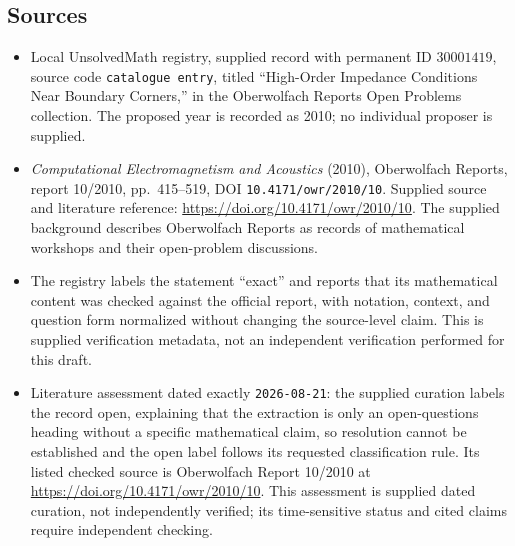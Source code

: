 \documentclass[11pt]{article}
\begin{document}
\subsection{Sources}
\begin{itemize}
\item Local UnsolvedMath registry, supplied record with permanent ID \(30001419\), source code \texttt{catalogue entry}, titled ``High-Order Impedance Conditions Near Boundary Corners,'' in the Oberwolfach Reports Open Problems collection. The proposed year is recorded as 2010; no individual proposer is supplied.
\item \emph{Computational Electromagnetism and Acoustics} (2010), Oberwolfach Reports, report 10/2010, pp.~415--519, DOI \texttt{10.4171/owr/2010/10}. Supplied source and literature reference: \url{https://doi.org/10.4171/owr/2010/10}. The supplied background describes Oberwolfach Reports as records of mathematical workshops and their open-problem discussions.
\item The registry labels the statement ``exact'' and reports that its mathematical content was checked against the official report, with notation, context, and question form normalized without changing the source-level claim. This is supplied verification metadata, not an independent verification performed for this draft.
\item Literature assessment dated exactly \texttt{2026-08-21}: the supplied curation labels the record open, explaining that the extraction is only an open-questions heading without a specific mathematical claim, so resolution cannot be established and the open label follows its requested classification rule. Its listed checked source is Oberwolfach Report 10/2010 at \url{https://doi.org/10.4171/owr/2010/10}. This assessment is supplied dated curation, not independently verified; its time-sensitive status and cited claims require independent checking.
\end{itemize}
\end{document}
